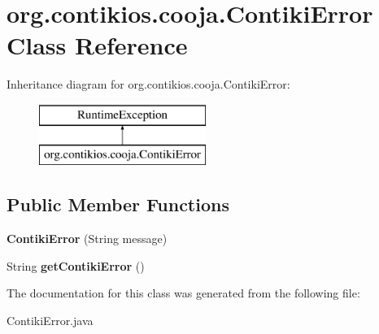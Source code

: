 \hypertarget{classorg_1_1contikios_1_1cooja_1_1ContikiError}{\section{org.\-contikios.\-cooja.\-Contiki\-Error Class Reference}
\label{classorg_1_1contikios_1_1cooja_1_1ContikiError}
}
Inheritance diagram for org.\-contikios.\-cooja.\-Contiki\-Error\-:\begin{figure}[H]
\begin{center}
\leavevmode
\includegraphics[height=2.000000cm]{classorg_1_1contikios_1_1cooja_1_1ContikiError}
\end{center}
\end{figure}
\subsection*{Public Member Functions}
\begin{DoxyCompactItemize}
\item 
\hypertarget{classorg_1_1contikios_1_1cooja_1_1ContikiError_a78e53f9f4b5afab00689b5a756e11c1a}{{\bfseries Contiki\-Error} (String message)}\label{classorg_1_1contikios_1_1cooja_1_1ContikiError_a78e53f9f4b5afab00689b5a756e11c1a}

\item 
\hypertarget{classorg_1_1contikios_1_1cooja_1_1ContikiError_af1b1ca40c9d6f6fdee7033dab73596d5}{String {\bfseries get\-Contiki\-Error} ()}\label{classorg_1_1contikios_1_1cooja_1_1ContikiError_af1b1ca40c9d6f6fdee7033dab73596d5}

\end{DoxyCompactItemize}


The documentation for this class was generated from the following file\-:\begin{DoxyCompactItemize}
\item 
Contiki\-Error.\-java\end{DoxyCompactItemize}
